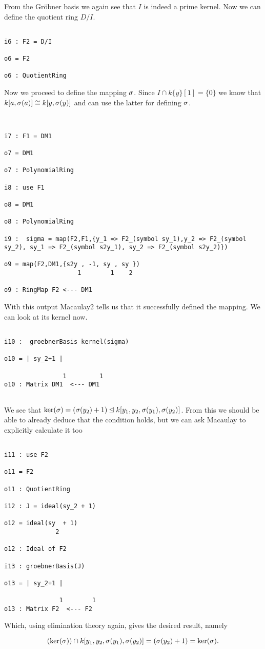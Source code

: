 From the Gr\"{o}bner basis we again see that $I$ is indeed a prime kernel.
Now we can define the quotient ring $D/I$.

\begin{lstlisting}

i6 : F2 = D/I

o6 = F2

o6 : QuotientRing

\end{lstlisting}

Now we proceed to define the mapping $\sigma$. Since $I \cap k\{y\}[1] = \{ 0 \}$ 
we know that $k[a,\sigma(a)] \cong k[y,\sigma(y)]$ and can use the latter for defining $\sigma$.

\begin{lstlisting}


i7 : F1 = DM1

o7 = DM1

o7 : PolynomialRing

i8 : use F1

o8 = DM1

o8 : PolynomialRing

i9 :  sigma = map(F2,F1,{y_1 => F2_(symbol sy_1),y_2 => F2_(symbol sy_2), sy_1 => F2_(symbol s2y_1), sy_2 => F2_(symbol s2y_2)})

o9 = map(F2,DM1,{s2y , -1, sy , sy })
                    1        1    2

o9 : RingMap F2 <--- DM1

\end{lstlisting}

With this output Macaulay2 tells us that it successfully defined the mapping. We can look at its kernel now.

\begin{lstlisting}

i10 :  groebnerBasis kernel(sigma)

o10 = | sy_2+1 |

                1         1
o10 : Matrix DM1  <--- DM1


\end{lstlisting}


We see that $\ker(\sigma) = (\sigma(y_2) + 1) \unlhd k[y_1,y_2, \sigma(y_1), \sigma(y_2)]$. 
From this we should be able to already deduce that the condition holds, but we can ask Macaulay to explicitly
calculate it too

\begin{lstlisting}

i11 : use F2

o11 = F2

o11 : QuotientRing

i12 : J = ideal(sy_2 + 1)

o12 = ideal(sy  + 1)
              2

o12 : Ideal of F2

i13 : groebnerBasis(J)

o13 = | sy_2+1 |

               1        1
o13 : Matrix F2  <--- F2

\end{lstlisting}
 
Which, using elimination theory again, gives the desired result, namely

$$ (\ker(\sigma)) \cap k[y_1,y_2,\sigma(y_1),\sigma(y_2)] = (\sigma(y_2) +1) = \ker(\sigma) .$$
